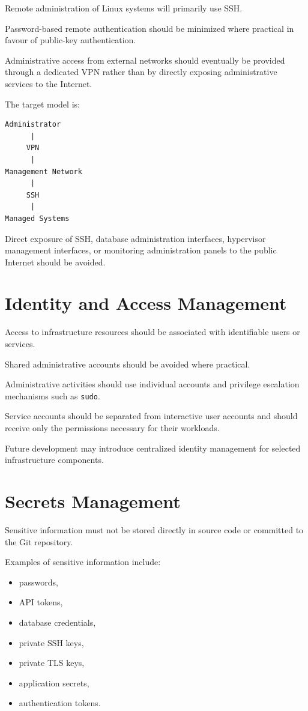 Remote administration of Linux systems will primarily use SSH.

Password-based remote authentication should be minimized where practical
in favour of public-key authentication.

Administrative access from external networks should eventually be provided
through a dedicated VPN rather than by directly exposing administrative
services to the Internet.

The target model is:

\begin{verbatim}
Administrator
      |
     VPN
      |
Management Network
      |
     SSH
      |
Managed Systems
\end{verbatim}

Direct exposure of SSH, database administration interfaces, hypervisor
management interfaces, or monitoring administration panels to the public
Internet should be avoided.


\section{Identity and Access Management}

Access to infrastructure resources should be associated with identifiable
users or services.

Shared administrative accounts should be avoided where practical.

Administrative activities should use individual accounts and privilege
escalation mechanisms such as \texttt{sudo}.

Service accounts should be separated from interactive user accounts and
should receive only the permissions necessary for their workloads.

Future development may introduce centralized identity management for
selected infrastructure components.


\section{Secrets Management}

Sensitive information must not be stored directly in source code or
committed to the Git repository.

Examples of sensitive information include:

\begin{itemize}
    \item passwords,
    \item API tokens,
    \item database credentials,
    \item private SSH keys,
    \item private TLS keys,
    \item application secrets,
    \item authentication tokens.
\end{itemize}

